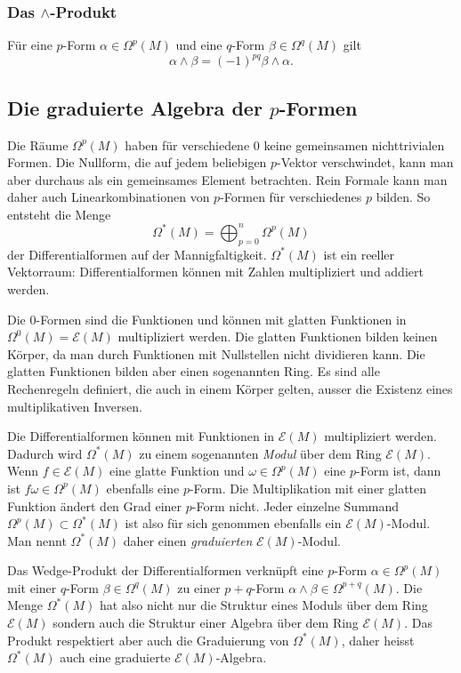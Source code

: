%
%
\subsubsection{Das $\wedge$-Produkt}

\begin{satz} Für eine $p$-Form $\alpha\in\Omega^p(M)$ und eine $q$-Form
$\beta\in\Omega^q(M)$ gilt
\[
\alpha\wedge\beta
=
(-1)^{pq}\beta\wedge\alpha.
\]
\end{satz}

%
%
\subsection{Die graduierte Algebra der $p$-Formen}
Die Räume $\Omega^p(M)$ haben für verschiedene $0$ keine gemeinsamen 
nichttrivialen Formen.
Die Nullform, die auf jedem beliebigen $p$-Vektor verschwindet, kann man
aber durchaus als ein gemeinsames Element betrachten.
Rein Formale kann man daher auch Linearkombinationen von $p$-Formen für
verschiedenes $p$ bilden.
So entsteht die Menge
\[
\Omega^*(M)
=
\bigoplus_{p=0}^n \Omega^p (M)
\]
der Differentialformen auf der Mannigfaltigkeit.
$\Omega^*(M)$ ist ein reeller Vektorraum: Differentialformen können mit
Zahlen multipliziert und addiert werden.

Die $0$-Formen sind die Funktionen und können mit glatten Funktionen in
$\Omega^0(M)=\mathscr{E}(M)$ multipliziert werden.
Die glatten Funktionen bilden keinen Körper, da man durch Funktionen mit
Nullstellen nicht dividieren kann.
Die glatten Funktionen bilden aber einen sogenannten Ring. 
%
Es sind alle Rechenregeln definiert, die auch in einem Körper gelten,
ausser die Existenz eines multiplikativen Inversen.

Die Differentialformen können mit Funktionen in $\mathscr{E}(M)$
multipliziert werden.
Dadurch wird $\Omega^*(M)$ zu einem sogenannten {\em Modul} über
dem Ring $\mathscr{E}(M)$.
Wenn $f\in\mathscr{E}(M)$ eine glatte Funktion und $\omega\in\Omega^p(M)$
eine $p$-Form ist, dann ist $f\omega\in\Omega^p(M)$ ebenfalls eine
$p$-Form.
Die Multiplikation mit einer glatten Funktion ändert den Grad einer
$p$-Form nicht.
Jeder einzelne Summand $\Omega^p(M)\subset\Omega^*(M)$ ist also für
sich genommen ebenfalls ein $\mathscr{E}(M)$-Modul.
Man nennt $\Omega^*(M)$ daher einen {\em graduierten} $\mathscr{E}(M)$-Modul.
%
%

Das Wedge-Produkt der Differentialformen verknüpft eine $p$-Form
$\alpha\in\Omega^p(M)$ mit einer $q$-Form $\beta\in\Omega^q(M)$
zu einer $p+q$-Form $\alpha\wedge\beta\in\Omega^{p+q}(M)$.
Die Menge $\Omega^*(M)$ hat also nicht nur die Struktur eines
Moduls über dem Ring $\mathscr{E}(M)$ sondern auch die Struktur
einer Algebra über dem Ring $\mathscr{E}(M)$.
Das Produkt respektiert aber auch die Graduierung von $\Omega^*(M)$,
daher heisst $\Omega^*(M)$ auch eine graduierte $\mathscr{E}(M)$-Algebra.


